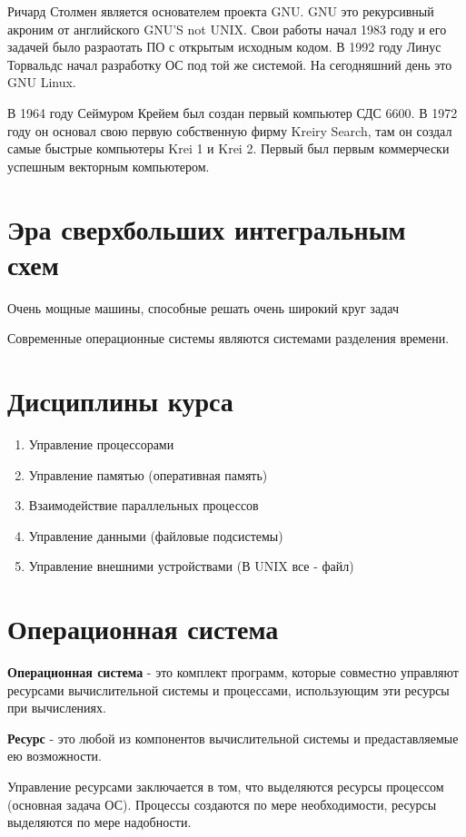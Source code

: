 \documentclass[a4paper, 14pt]{report}
\begin{document}
Ричард Столмен является основателем проекта GNU. GNU это рекурсивный акроним от английского GNU'S not UNIX. Свои работы начал 1983 году и его задачей было разраотать ПО с открытым исходным кодом. В 1992 году Линус Торвальдс начал разработку ОС под той же системой. На сегодняшний день это GNU Linux.

В 1964 году Сеймуром Крейем был создан первый компьютер СДС 6600. В 1972 году он основал свою первую собственную фирму Kreiry Search, там он создал самые быстрые компьютеры Krei 1 и Krei 2. Первый был первым коммерчески успешным векторным компьютером.

\section{Эра сверхбольших интегральным схем}

Очень мощные машины, способные решать очень широкий круг задач

Современные операционные системы являются системами разделения времени.

\section{Дисциплины курса}

\begin{enumerate}
    \item Управление процессорами
    \item Управление памятью (оперативная память)
    \item Взаимодействие параллельных процессов
    \item Управление данными (файловые подсистемы)
    \item Управление внешними устройствами (В UNIX все - файл)
\end{enumerate}

\section{Операционная система}

\textbf{Операционная система} - это комплект программ, которые совместно управляют ресурсами вычислительной системы и процессами, использующим эти ресурсы при вычислениях.

\textbf{Ресурс} - это любой из компонентов вычислительной системы и предаставляемые ею возможности.

Управление ресурсами заключается в том, что выделяются ресурсы процессом (основная задача ОС). Процессы создаются по мере необходимости, ресурсы выделяются по мере надобности.
\end{document}
